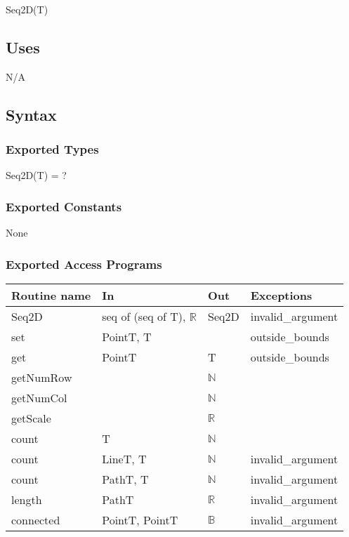\documentclass[12pt]{article}
\begin{document}
Seq2D(T)

\subsection* {Uses}

N/A

\subsection* {Syntax}

\subsubsection* {Exported Types}

Seq2D(T) = ?

\subsubsection* {Exported Constants}

None

\subsubsection* {Exported Access Programs}

\begin{tabular}{| l | l | l | p{5cm} |}
\hline
\textbf{Routine name} & \textbf{In} & \textbf{Out} & \textbf{Exceptions}\\
\hline
Seq2D & seq of (seq of T), $\mathbb{R}$ & Seq2D & invalid\_argument\\
\hline
set & PointT, T & ~ & outside\_bounds\\
\hline
get & PointT & T & outside\_bounds\\
\hline
getNumRow & ~ & $\mathbb{N}$ & \\
\hline
getNumCol & ~ & $\mathbb{N}$ & \\
\hline
getScale & ~ & $\mathbb{R}$ & \\
\hline
count & T & $\mathbb{N}$ & \\
\hline
count & LineT, T & $\mathbb{N}$ & invalid\_argument\\
\hline
count & PathT, T & $\mathbb{N}$ & invalid\_argument\\
\hline
length & PathT & $\mathbb{R}$ & invalid\_argument\\
\hline
connected & PointT, PointT & $\mathbb{B}$ & invalid\_argument\\
\hline
\end{tabular}
\end{document}
